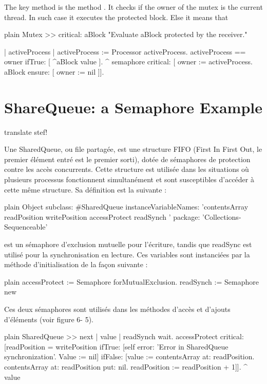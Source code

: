 \documentclass[10pt,twoside,english]{_support/latex/sbabook/sbabook}
\begin{document}
The key method is the method . It checks if the owner of the mutex is the current thread.
In such case it executes the protected block. 
Else it means that 

\begin{displaycode}{plain}
Mutex >> critical: aBlock
	"Evaluate aBlock protected by the receiver."

	| activeProcess |
	activeProcess := Processor activeProcess.
	activeProcess == owner ifTrue: [ ^aBlock value ].
	^ semaphore critical: [
		owner := activeProcess.
		aBlock ensure: [ owner := nil ]].
\end{displaycode}
\chapter{ShareQueue: a Semaphore Example}
\begin{todo}
translate stef! 
\end{todo}

Une SharedQueue, ou file partag\'{e}e, est une structure FIFO (First In First Out, le premier \'{e}l\'{e}ment entr\'{e} est le premier sorti), dot\'{e}e de s\'{e}maphores de protection contre les acc\`{e}s concurrents. Cette structure est utilis\'{e}e dans les situations o\`{u} plusieurs processus fonctionnent simultan\'{e}ment et sont susceptibles d’acc\'{e}der \`{a} cette m\^{e}me structure.
Sa d\'{e}finition est la suivante :

\begin{displaycode}{plain}
Object subclass: #SharedQueue
	instanceVariableNames: 'contentsArray readPosition writePosition accessProtect readSynch ' 
	package: 'Collections-Sequenceable'
\end{displaycode}

 est un s\'{e}maphore d’exclusion mutuelle pour l’\'{e}criture, tandis que readSync est utilis\'{e} pour la synchronisation en lecture. Ces variables sont instanci\'{e}es par la m\'{e}thode d’initialisation de la fa\c{c}on suivante :

\begin{displaycode}{plain}
accessProtect := Semaphore forMutualExclusion.
readSynch := Semaphore new
\end{displaycode}

Ces deux s\'{e}maphores sont utilis\'{e}s dans les m\'{e}thodes d’acc\`{e}s et d’ajouts d’\'{e}l\'{e}ments (voir figure 6- 5).

\begin{displaycode}{plain}
SharedQueue >> next
	| value |
	readSynch wait.
	accessProtect
		critical: [readPosition = writePosition
				ifTrue: [self error: 'Error in SharedQueue synchronization'.
					Value := nil]
				ifFalse: [value := contentsArray at: readPosition.
					contentsArray at: readPosition put: nil.
					readPosition := readPosition + 1]].
	^ value
\end{displaycode}
\end{document}
